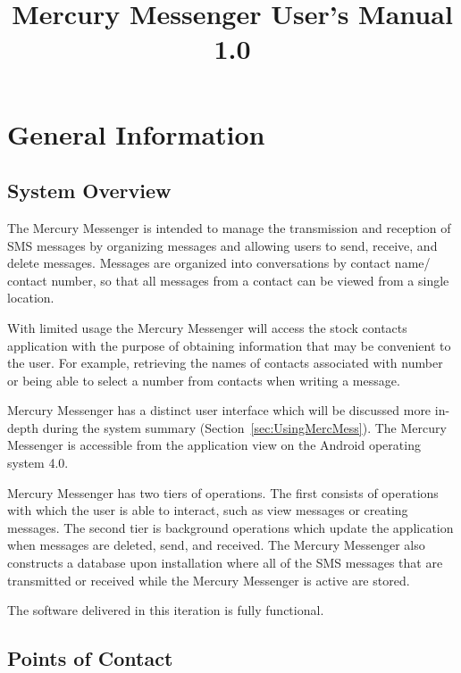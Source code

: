 \documentclass{article}
\begin{document}
\title{Mercury Messenger User's Manual 1.0}
\maketitle

\tableofcontents

\section{General Information}

\subsection{System Overview}
\par The Mercury Messenger is intended to manage the transmission and reception of SMS messages by organizing messages and allowing users to send, receive, and delete messages. Messages are organized into conversations by contact name/ contact number, so that all messages from a contact can be viewed from a single location.
\par With limited usage the Mercury Messenger will access the stock contacts application with the purpose of obtaining information that may be convenient to the user. For example, retrieving the names of contacts associated with number or being able to select a number from contacts when writing a message.
\par Mercury Messenger has a distinct user interface which will be discussed more in-depth during the system summary (Section~\ref{sec:UsingMercMess}). The Mercury Messenger is accessible from the application view on the Android operating system 4.0.
\par Mercury Messenger has two tiers of operations. The first consists of operations with which the user is able to interact, such as view messages or creating messages. The second tier is background operations which update the application when messages are deleted, send, and received. The Mercury Messenger also constructs a database upon installation where all of the SMS messages that are transmitted or received while the Mercury Messenger is active are stored.
\par The software delivered in this iteration is fully functional.


\subsection{Points of Contact}
\end{document}

